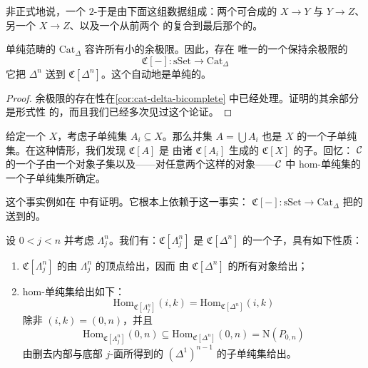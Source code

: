 \begin{observation}
非正式地说，一个 $2$-\trSimplex{}于是由下面这组数据组成：两个可合成的\trMorphism{}%
$X \to Y$ 与 $Y \to Z$、另一个\trMorphism{} $X \to Z$、以及一个从前两个\trMorphism{}%
的复合到最后那个\trMorphism{}的\trHomotopy{}。
\end{observation}

\begin{lemma}\label{lem:cat-delta-small-colimits}
单纯\trEnrichment{}范畴的\trCategory{} $\mathrm{Cat}_{\Delta}$ 容许所有小的余极限。因此，存在
唯一的一个保持余极限的\trFunctor{}%
\[
\mathfrak{C}[-]\colon \mathrm{sSet} \to \mathrm{Cat}_{\Delta}
\]
它把 $\Delta^n$ 送到 $\mathfrak{C}[\Delta^n]$。这个\trFunctor{}自动地是单纯\trNerve{}\trFunctor{}的\trLeftAdjoint{}。
\end{lemma}

\begin{proof}
余极限的存在性在\cref{cor:cat-delta-bicomplete} 中已经处理。证明的其余部分是形式性
的，而且我们已经多次见过这个论证。
\end{proof}

\begin{fact}\label{fact:c-generated-subcategory}
给定一个\trSimplicialSet{} $X$，考虑子单纯集 $A_i \subseteq X$。那么并集
$A = \bigcup A_i$ 也是 $X$ 的一个子单纯集。在这种情形，我们发现 $\mathfrak{C}[A]$ 是
由诸 $\mathfrak{C}[A_i]$ 生成的 $\mathfrak{C}[X]$ 的子\trSimplicialCategory{}。回忆：\trSimplicialCategory{} $\mathcal{C}$
的一个子\trSimplicialCategory{}由一个对象子集以及——对任意两个这样的对象——$\mathcal{C}$ 中 hom-单纯集的
一个子单纯集所确定。

这个事实例如在 \cite[Corollary 1.15]{Joy07} 中有证明。它根本上依赖于这一事实：\trFunctor{}%
$\mathfrak{C}[-]\colon \mathrm{sSet} \to \mathrm{Cat}_{\Delta}$ 把\trSimplicialSet{}的\trMonomorphism{}送到\trSimplicialCategory{}的\trMonomorphism{}。
\end{fact}

\begin{lemma}\label{lem:c-lambda-n-j}
设 $0 < j < n$ 并考虑\trHorn{} $\Lambda^n_j$。我们有：$\mathfrak{C}[\Lambda^n_j]$
是 $\mathfrak{C}[\Delta^n]$ 的一个子\trSimplicialCategory{}，具有如下性质：
\begin{enumerate}[label=(\arabic*)]
  \item $\mathfrak{C}[\Lambda^n_j]$ 的\trObject{}由 $\Lambda^n_j$ 的顶点给出，因而
  由 $\mathfrak{C}[\Delta^n]$ 的所有对象给出；
  \item hom-单纯集给出如下：
  \[
  \mathrm{Hom}_{\mathfrak{C}[\Lambda^n_j]}(i, k) =
  \mathrm{Hom}_{\mathfrak{C}[\Delta^n]}(i, k)
  \]
  除非 $(i, k) = (0, n)$，并且
  \[
  \mathrm{Hom}_{\mathfrak{C}[\Lambda^n_j]}(0, n) \subseteq
  \mathrm{Hom}_{\mathfrak{C}[\Delta^n]}(0, n) = \mathrm{N}(P_{0,n})
  \]
  由删去内部与底部 $j$-面所得到的 $(\Delta^1)^{n-1}$ 的子单纯集给出。
\end{enumerate}
\end{lemma}

